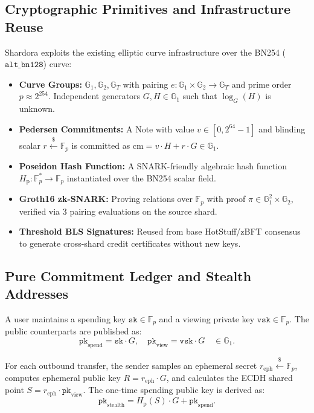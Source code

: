 \documentclass[journal,10pt,twocolumn]{IEEEtran}
\theoremstyle{definition}
\theoremstyle{remark}
\begin{document}
\subsection{Cryptographic Primitives and Infrastructure Reuse}
Shardora exploits the existing elliptic curve infrastructure over the BN254 ($\mathtt{alt\_bn128}$) curve:
\begin{itemize}[leftmargin=*]
    \item \textbf{Curve Groups:} $\mathbb{G}_1, \mathbb{G}_2, \mathbb{G}_T$ with pairing $e: \mathbb{G}_1 \times \mathbb{G}_2 \to \mathbb{G}_T$ and prime order $p \approx 2^{254}$. Independent generators $G, H \in \mathbb{G}_1$ such that $\log_G(H)$ is unknown.
    \item \textbf{Pedersen Commitments:} A Note with value $v \in [0, 2^{64}-1]$ and blinding scalar $r \xleftarrow{\$} \mathbb{F}_p$ is committed as $\text{cm} = v \cdot H + r \cdot G \in \mathbb{G}_1$.
    \item \textbf{Poseidon Hash Function:} A SNARK-friendly algebraic hash function $H_{\text{p}}: \mathbb{F}_p^* \to \mathbb{F}_p$ instantiated over the BN254 scalar field.
    \item \textbf{Groth16 zk-SNARK:} Proving relations over $\mathbb{F}_p$ with proof $\pi \in \mathbb{G}_1^2 \times \mathbb{G}_2$, verified via 3 pairing evaluations on the source shard.
    \item \textbf{Threshold BLS Signatures:} Reused from base HotStuff/zBFT consensus to generate cross-shard credit certificates without new keys.
\end{itemize}

\subsection{Pure Commitment Ledger and Stealth Addresses}
A user maintains a spending key $\mathtt{sk} \in \mathbb{F}_p$ and a viewing private key $\mathtt{vsk} \in \mathbb{F}_p$. The public counterparts are published as:
\begin{equation}
\mathtt{pk}_{\text{spend}} = \mathtt{sk} \cdot G, \quad \mathtt{pk}_{\text{view}} = \mathtt{vsk} \cdot G \quad \in \mathbb{G}_1.
\end{equation}

For each outbound transfer, the sender samples an ephemeral secret $r_{\text{eph}} \xleftarrow{\$} \mathbb{F}_p$, computes ephemeral public key $R = r_{\text{eph}} \cdot G$, and calculates the ECDH shared point $S = r_{\text{eph}} \cdot \mathtt{pk}_{\text{view}}$. The one-time spending public key is derived as:
\begin{equation}
\mathtt{pk}_{\text{stealth}} = H_{\text{p}}(S) \cdot G + \mathtt{pk}_{\text{spend}}.
\end{equation}
\end{document}
